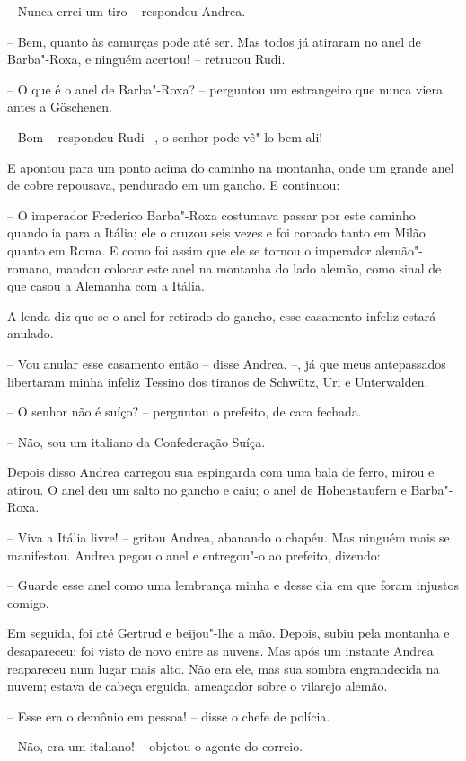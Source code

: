 -- Nunca errei um tiro -- respondeu Andrea.

-- Bem, quanto às camurças pode até ser. Mas todos já atiraram no anel de
Barba"-Roxa, e ninguém acertou! -- retrucou Rudi.

-- O que é o anel de Barba"-Roxa? -- perguntou um estrangeiro que nunca
viera antes a Göschenen.

-- Bom -- respondeu Rudi --, o senhor pode vê"-lo bem ali!

E apontou para um ponto acima do caminho na montanha, onde um grande
anel de cobre repousava, pendurado em um gancho. E continuou:

-- O imperador Frederico Barba"-Roxa costumava passar por este caminho
quando ia para a Itália; ele o cruzou seis vezes e foi coroado tanto em
Milão quanto em Roma. E como foi assim que ele se tornou o imperador
alemão"-romano, mandou colocar este anel na montanha do lado alemão,
como sinal de que casou a Alemanha com a Itália. 

A lenda diz que se o anel for retirado do gancho, esse casamento infeliz
estará anulado.

-- Vou anular esse casamento então -- disse Andrea. --, já que meus
antepassados libertaram minha infeliz Tessino dos tiranos de Schwütz,
Uri e Unterwalden.

-- O senhor não é suíço? -- perguntou o prefeito, de cara fechada.

-- Não, sou um italiano da Confederação Suíça.

Depois disso Andrea carregou sua espingarda com uma bala de ferro, mirou
e atirou. O anel deu um salto no gancho e caiu; o anel de Hohenstaufern
e Barba"-Roxa.

-- Viva a Itália livre! -- gritou Andrea, abanando o chapéu. Mas ninguém
mais se manifestou. Andrea pegou o anel e entregou"-o ao prefeito,
dizendo:

-- Guarde esse anel como uma lembrança minha e desse dia em que foram
injustos comigo.

Em seguida, foi até Gertrud e beijou"-lhe a mão. Depois, subiu pela
montanha e desapareceu; foi visto de novo entre as nuvens. Mas após um
instante Andrea reapareceu num lugar mais alto. Não era ele, mas sua
sombra engrandecida na nuvem; estava de cabeça erguida, ameaçador sobre
o vilarejo alemão.

-- Esse era o demônio em pessoa! -- disse o chefe de polícia.

-- Não, era um italiano! -- objetou o agente do correio.

